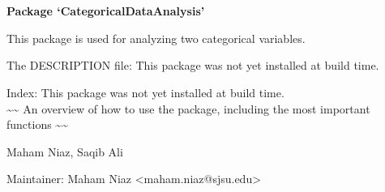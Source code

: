 \documentclass[letterpaper]{book}
\begin{document}
\chapter*{}
\begin{center}
{\textbf{\huge Package `CategoricalDataAnalysis'}}
\par\bigskip{\large \today}
\end{center}
\begin{description}
\raggedright{}
\item[Type]
\item[Title]
\item[Version]
\item[Date]
\item[Author]
\item[Maintainer]\AsIs{}
\item[Description]
\item[License]
\item[Exports]
\end{description}
%
\begin{Description}\relax
This package is used for analyzing two categorical variables.  
\end{Description}
%
\begin{Details}\relax

The DESCRIPTION file:
This package was not yet installed at build time.\\{}

Index:  This package was not yet installed at build time.\\{}
\textasciitilde{}\textasciitilde{} An overview of how to use the package, including the most important functions \textasciitilde{}\textasciitilde{}
\end{Details}
%
\begin{Author}\relax
Maham Niaz, Saqib Ali

Maintainer: Maham Niaz <maham.niaz@sjsu.edu>
\end{Author}
\end{document}
